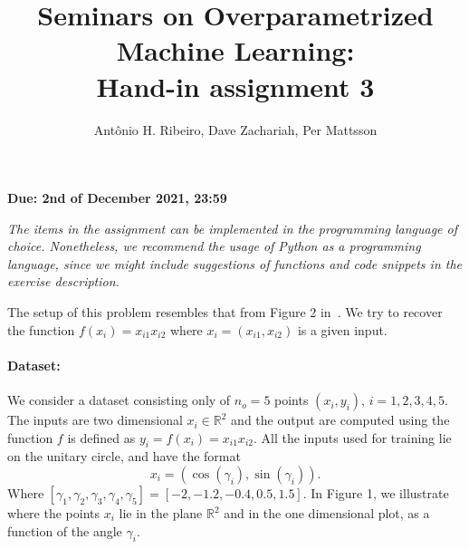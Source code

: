 \documentclass[a4paper,10pt]{article}
\date{}
\title{Seminars on Overparametrized Machine Learning: \\Hand-in assignment 3}
\author{Antônio H. Ribeiro, Dave Zachariah, Per Mattsson}
\newcommand{\R}{\mathbb{R}}
\newcounter{exercise}
\begin{document}
\maketitle
\begin{center}
	\large \textbf{Due: 2nd of December 2021, 23:59}
\end{center}

\textit{
The items in the assignment can be implemented in the programming language of choice.
Nonetheless, we recommend the usage of Python as a programming language, since we might include suggestions of functions and code snippets in the exercise description.}

The setup of this problem resembles that from Figure 2 in~\citep{jacot_neural_2018}.  We try to recover the function $f(x_i) = x_{i1} x_{i2}$ where $x_i = (x_{i1}, x_{i2})$ is a given input.

\paragraph{Dataset:} We consider a dataset consisting only of $n_o = 5$ points $(x_i, y_i)$, $i = 1, 2, 3, 4, 5$. The inputs are two dimensional $x_i \in \R^2$ and the output are computed using the function $f$ is defined as $y_i = f(x_i) = x_{i1} x_{i2}$. All the inputs used for training lie on the unitary circle, and have the format
\begin{equation}
    x_i = (\cos(\gamma_i), \sin(\gamma_i)).
\end{equation}
Where $[\gamma_1, \gamma_2, \gamma_3, \gamma_4, \gamma_5] = [-2, -1.2, -0.4, 0.5, 1.5]$. In Figure 1, we illustrate where the points $x_i$ lie in the plane $\R^2$ and in the one dimensional plot, as a function of the angle $\gamma_i$.
\end{document}
